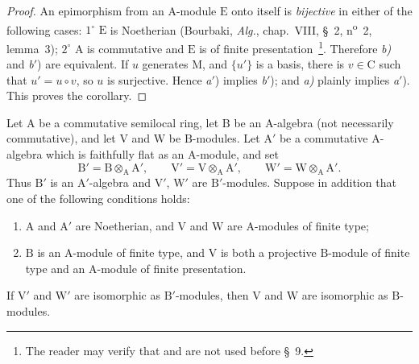 \begin{proof}
An epimorphism from an $\mathrm{A}$-module $\mathrm{E}$ onto itself is
\emph{bijective} in either of the following cases: \(1^\circ\) $\mathrm{E}$ is
Noetherian (Bourbaki, \emph{Alg.}, chap.~VIII, \S~2, n\textsuperscript{o}~2, lemma~3);
\(2^\circ\) $\mathrm{A}$ is commutative and $\mathrm{E}$ is of finite
presentation~\footnote{The reader may verify that
 and  are not used before \S~9.}.
  Therefore \emph{b)} and \emph{b}$'$) are equivalent. If $u$ generates
  $\mathrm{M}$,
  and $\{u'\}$ is a basis, there is $v\in\mathrm{C}$ such
  that $u'=u\circ v$, so $u$ is surjective. Hence \emph{a}$'$) implies
  \emph{b}$'$); and \emph{a)} plainly implies \emph{a}$'$). This proves
  the corollary.
\end{proof}

\begin{proposition}[2.5.8]
\label{IV.2.5.8}
Let $\mathrm{A}$ be a commutative semilocal ring, let $\mathrm{B}$ be an
$\mathrm{A}$-algebra \textnormal{(}not necessarily
commutative\textnormal{)}, and let $\mathrm{V}$ and $\mathrm{W}$ be
$\mathrm{B}$-modules. Let $\mathrm{A}'$ be a commutative
$\mathrm{A}$-algebra which is \textup{faithfully flat} as an $\mathrm{A}$-module,
and set
\[
  \mathrm{B}'=\mathrm{B}\otimes_{\mathrm{A}}\mathrm{A}',\qquad
  \mathrm{V}'=\mathrm{V}\otimes_{\mathrm{A}}\mathrm{A}',\qquad
  \mathrm{W}'=\mathrm{W}\otimes_{\mathrm{A}}\mathrm{A}'.
\]
Thus $\mathrm{B}'$ is an $\mathrm{A}'$-algebra and $\mathrm{V}'$,
$\mathrm{W}'$ are $\mathrm{B}'$-modules. Suppose in addition that one of
the following conditions holds:
\begin{enumerate}
  \item[\textup{(i)}] $\mathrm{A}$ and $\mathrm{A}'$ are Noetherian, and
  $\mathrm{V}$ and $\mathrm{W}$ are $\mathrm{A}$-modules of finite type;
  \item[\textup{(ii)}] $\mathrm{B}$ is an $\mathrm{A}$-module of finite type, and
  $\mathrm{V}$ is both a projective $\mathrm{B}$-module of finite type
  and an $\mathrm{A}$-module of finite presentation.
\end{enumerate}
If $\mathrm{V}'$ and $\mathrm{W}'$ are isomorphic as
$\mathrm{B}'$-modules, then $\mathrm{V}$ and $\mathrm{W}$ are isomorphic
as $\mathrm{B}$-modules.
\end{proposition}

